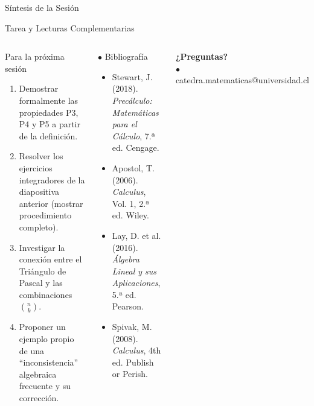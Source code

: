 \documentclass[12pt, aspectratio=169]{beamer}
\begin{document}
\begin{frame}{Síntesis de la Sesión}
  \vspace{8pt}
  \begin{center}
  \end{center}
\end{frame}

\begin{frame}{Tarea y Lecturas Complementarias}
  \begin{columns}[T]
    \begin{block}{\; Para la próxima sesión}
      \small
      \begin{enumerate}[leftmargin=*]
        \item Demostrar formalmente las propiedades P3, P4 y P5 a partir de la definición.
        \item Resolver los ejercicios integradores de la diapositiva anterior (mostrar procedimiento completo).
        \item Investigar la conexión entre el Triángulo de Pascal y las combinaciones $\binom{n}{k}$.
        \item Proponer un ejemplo propio de una ``inconsistencia'' algebraica frecuente y su corrección.
      \end{enumerate}
    \end{block}

    \begin{block}{$\bullet$\; Bibliografía}
      \small
      \begin{itemize}[leftmargin=*]
        \item Stewart, J. (2018). \textit{Precálculo: Matemáticas para el Cálculo}, 7.ª ed. Cengage.
        \item Apostol, T. (2006). \textit{Calculus}, Vol. 1, 2.ª ed. Wiley.
        \item Lay, D. et al. (2016). \textit{Álgebra Lineal y sus Aplicaciones}, 5.ª ed. Pearson.
        \item Spivak, M. (2008). \textit{Calculus}, 4th ed. Publish or Perish.
      \end{itemize}
    \end{block}
    \vspace{6pt}
    \begin{center}
      \large\textbf{\color{azuloscuro}¿Preguntas?}\\[4pt]
      \small\color{gray}$\bullet$\; catedra.matematicas@universidad.cl
    \end{center}
  \end{columns}
\end{frame}
\end{document}
